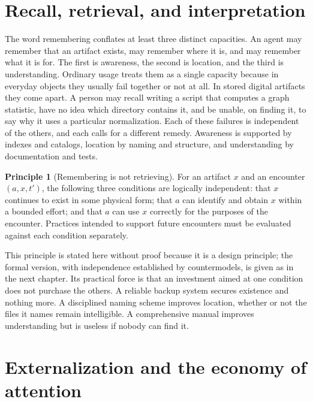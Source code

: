 \documentclass[11pt,twoside,openright]{book}
\theoremstyle{plain}
\theoremstyle{definition}
\newtheorem{principle}[theorem]{Principle}
\theoremstyle{remark}
\begin{document}
\section{Recall, retrieval, and interpretation}

The word remembering conflates at least three distinct capacities. An agent may remember that an artifact exists, may remember where it is, and may remember what it is for. The first is awareness, the second is location, and the third is understanding. Ordinary usage treats them as a single capacity because in everyday objects they usually fail together or not at all. In stored digital artifacts they come apart. A person may recall writing a script that computes a graph statistic, have no idea which directory contains it, and be unable, on finding it, to say why it uses a particular normalization. Each of these failures is independent of the others, and each calls for a different remedy. Awareness is supported by indexes and catalogs, location by naming and structure, and understanding by documentation and tests.

\begin{principle}[Remembering is not retrieving]\label{pr:notretrieving}
For an artifact $x$ and an encounter $(a,x,t')$, the following three conditions are logically independent: that $x$ continues to exist in some physical form; that $a$ can identify and obtain $x$ within a bounded effort; and that $a$ can use $x$ correctly for the purposes of the encounter. Practices intended to support future encounters must be evaluated against each condition separately.
\end{principle}

This principle is stated here without proof because it is a design principle; the formal version, with independence established by countermodels, is given as  in the next chapter. Its practical force is that an investment aimed at one condition does not purchase the others. A reliable backup system secures existence and nothing more. A disciplined naming scheme improves location, whether or not the files it names remain intelligible. A comprehensive manual improves understanding but is useless if nobody can find it.

\section{Externalization and the economy of attention}
\end{document}
